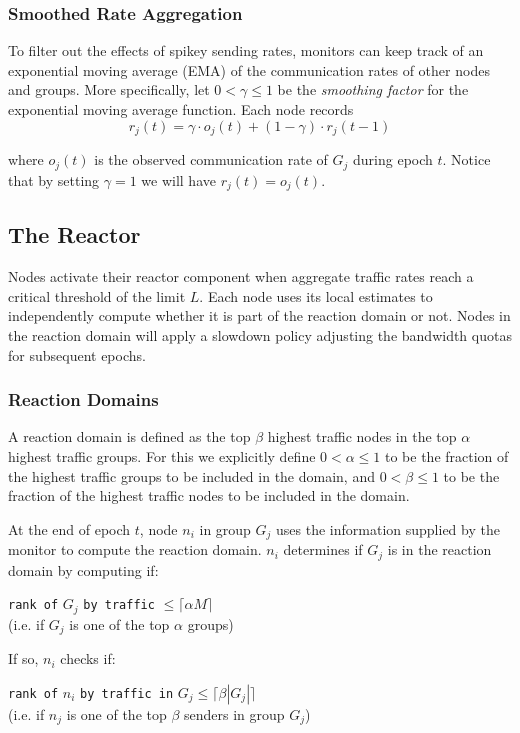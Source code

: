 \subsubsection{Smoothed Rate Aggregation}
To filter out the effects of spikey sending rates, monitors can keep track of an exponential moving average (EMA) of the communication rates of other nodes and groups. More specifically, let $0 < \gamma \leq 1$ be the \textit{smoothing factor} for the exponential moving average function. Each node records
\[ r_j(t) = \gamma \cdot o_j(t) + (1 - \gamma) \cdot r_j(t-1) \]

where $o_j(t)$ is the observed communication rate of $G_j$ during epoch $t$. Notice that by setting $\gamma = 1$ we will have $r_j(t) = o_j(t)$.


\subsection{The Reactor}
Nodes activate their reactor component when aggregate traffic rates reach a critical threshold of the limit $L$. Each node uses its local estimates to independently compute whether it is part of the reaction domain or not. Nodes in the reaction domain will apply a slowdown policy adjusting the bandwidth quotas for subsequent epochs.

\subsubsection*{Reaction Domains}
A reaction domain is defined as the top $\beta$ highest traffic nodes in the top $\alpha$ highest traffic groups. For this we explicitly define $0 < \alpha \leq 1$ to be the fraction of the highest traffic groups to be included in the domain, and $0 < \beta \leq 1$ to be the fraction of the highest traffic nodes to be included in the domain.

At the end of epoch $t$, node $n_i$ in group $G_j$ uses the information supplied by the monitor to compute the reaction domain. $n_i$ determines if $G_j$ is in the reaction domain by computing if:

\begin{center}
\verb|rank of| $G_j$ \verb|by traffic| $\leq \lceil \alpha M \rceil$\\
(i.e. if $G_j$ is one of the top $\alpha$ groups)
\end{center}

If so, $n_i$ checks if:
\begin{center}
\verb|rank of| $n_i$ \verb|by traffic in| $G_j \leq \lceil \beta |G_j| \rceil$\\
(i.e. if $n_j$ is one of the top $\beta$ senders in group $G_j$)
\end{center}

